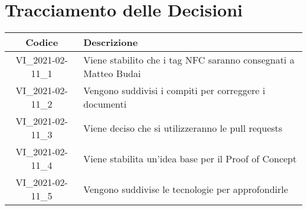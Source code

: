 \section*{Tracciamento delle Decisioni}

\begin{center}
	\begin{longtable}{|c|p{13cm}|}
	\hline
	\rowcolor{lighter-grayer}
	\textbf{Codice} & \textbf{Descrizione} \\
	\hline
	\endfirsthead

	\hline
	VI\_2021-02-11\_1 & Viene stabilito che i tag NFC saranno consegnati a Matteo Budai \\
	\hline
	VI\_2021-02-11\_2 & Vengono suddivisi i compiti per correggere i documenti \\
	\hline
	VI\_2021-02-11\_3 & Viene deciso che si utilizzeranno le pull requests \\
	\hline
	VI\_2021-02-11\_4 & Viene stabilita un'idea base per il Proof of Concept \\
	\hline
	VI\_2021-02-11\_5 & Vengono suddivise le tecnologie per approfondirle \\
	\hline
	

	\end{longtable}
\end{center}
